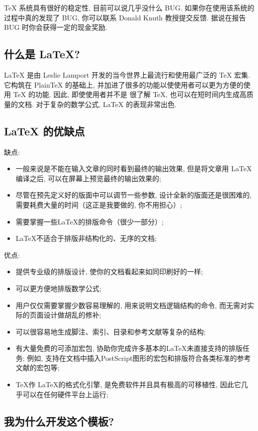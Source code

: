 \documentclass[doctor]{cugthesis}
\begin{document}
    \TeX{} 系统具有很好的稳定性, 目前可以说几乎没什么 BUG. 如果你在使用该系统的过程中真的发现了
    BUG, 你可以联系 Donald Knuth 教授提交反馈. 据说在报告 BUG 时你会获得一定的现金奖励.
\subsection{什么是 \LaTeX{}?}
\label{sec:sub_what_is_latex_}
    \LaTeX{} 是由 Leslie Lamport 开发的当今世界上最流行和使用最广泛的 \TeX{} 宏集. 它构筑在 PlainTeX
    的基础上, 并加进了很多的功能以使使用者可以更为方便的使用 \TeX{} 的功能. 因此, 即使使用者并不是
    很了解 \TeX{}, 也可以在短时间内生成高质量的文档. 对于复杂的数学公式, \LaTeX{} 的表现非常出色.

\subsection{\LaTeX{} 的优缺点}
\label{sec:sub_latex_advantages_disabvantages_}
缺点: 
\begin{itemize}
    \item 一般来说是不能在输入文章的同时看到最终的输出效果, 但是将文章用 \LaTeX{}编译之后, 可以在屏幕上预览最终的输出效果的; 
    \item 尽管在预先定义好的版面中可以调节一些参数, 设计全新的版面还是很困难的, 需要耗费大量的时间（这正是我要做的, 你不用担心）; 
    \item 需要掌握一些\LaTeX{}的排版命令（很少一部分）; 
    \item \LaTeX{}不适合于排版非结构化的、无序的文档; 
\end{itemize}

优点:
\begin{itemize}
    \item 提供专业级的排版设计, 使你的文档看起来如同印刷好的一样; 
    \item 可以更方便地排版数学公式; 
    \item 用户仅仅需要掌握少数容易理解的, 用来说明文档逻辑结构的命令, 而无需对实际的页面设计做胡乱的修补; 
    \item 可以很容易地生成脚注、索引、目录和参考文献等复杂的结构; 
    \item 有大量免费的可添加宏包, 协助你完成许多基本的LaTeX未直接支持的排版任务; 例如, 支持在文档中插入PostScript图形的宏包和排版符合各类标准的参考文献的宏包等; 
    \item \TeX{}作 \LaTeX{}的格式化引擎, 是免费软件并且具有极高的可移植性, 因此它几乎可以在任何硬件平台上运行; 
\end{itemize}
\subsection{我为什么开发这个模板?}
\end{document}
